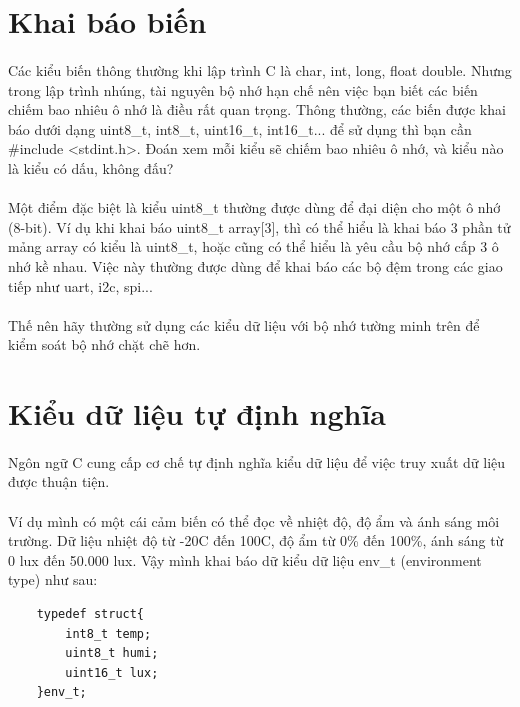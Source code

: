 \documentclass[12pt,a5paper]{book}
\begin{document}
	
	\section{Khai báo biến}
	\paragraph{}
Các kiểu biến thông thường khi lập trình C là char, int, long, float double. Nhưng trong lập trình nhúng, tài nguyên bộ nhớ hạn chế nên việc bạn biết các biến chiếm bao nhiêu ô nhớ là điều rất quan trọng. Thông thường, các biến được khai báo dưới dạng uint8\_t, int8\_t, uint16\_t, int16\_t... để sử dụng thì bạn cần  \#include <stdint.h>. Đoán xem mỗi kiểu sẽ chiếm bao nhiêu ô nhớ, và kiểu nào là kiểu có dấu, không đấu?
	\paragraph{}
	Một điểm đặc biệt là kiểu uint8\_t thường được dùng để đại diện cho một ô nhớ (8-bit). Ví dụ khi khai báo uint8\_t array[3], thì có thể hiểu là khai báo 3 phần tử mảng array có kiểu là uint8\_t, hoặc cũng có thể hiểu là yêu cầu bộ nhớ cấp 3 ô nhớ kề nhau. Việc này thường được dùng để khai báo các bộ đệm trong các giao tiếp như uart, i2c, spi...
	\paragraph{}
	Thế nên hãy thường sử dụng các kiểu dữ liệu với bộ nhớ tường minh trên để kiểm soát bộ nhớ chặt chẽ hơn.\\
\section{Kiểu dữ liệu tự định nghĩa}
\paragraph{}
Ngôn ngữ C cung cấp cơ chế tự định nghĩa kiểu dữ liệu để việc truy xuất dữ liệu được thuận tiện.

\paragraph{}
Ví dụ mình có một cái cảm biến có thể đọc về nhiệt độ, độ ẩm và ánh sáng môi trường. Dữ liệu nhiệt độ từ  -20\textdegree{}C đến 100\textdegree{}C, độ ẩm từ 0\% đến 100\%, ánh sáng từ 0 lux đến 50.000 lux. Vậy mình khai báo dữ kiểu dữ liệu env\_t (environment type) như sau: 
\begin{lstlisting}
	typedef struct{
		int8_t temp;
		uint8_t humi;
		uint16_t lux;
	}env_t;
\end{lstlisting}
\end{document}
